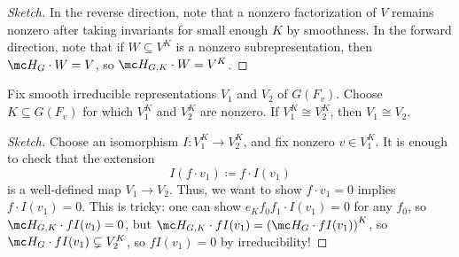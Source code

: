 \documentclass{article}
\begin{document}
\begin{proof}[Sketch]
	In the reverse direction, note that a nonzero factorization of $V$ remains nonzero after taking invariants for small enough $K$ by smoothness. In the forward direction, note that if $W\subseteq V^K$ is a nonzero subrepresentation, then $\mc H_G\cdot W=V$, so $\mc H_{G,K}\cdot W=V^K$.
\end{proof}
\begin{lemma}
	Fix smooth irreducible representations $V_1$ and $V_2$ of $G(F_v)$. Choose $K\subseteq G(F_v)$ for which $V_1^K$ and $V_2^K$ are nonzero. If $V_1^K\cong V_2^K$, then $V_1\cong V_2$.
\end{lemma}
\begin{proof}[Sketch]
	Choose an isomorphism $I\colon V_1^K\to V_2^K$, and fix nonzero $v\in V_1^K$. It is enough to check that the extension
	\[I(f\cdot v_1)\coloneqq f\cdot I(v_1)\]
	is a well-defined map $V_1\to V_2$. Thus, we want to show $f\cdot v_1=0$ implies $f\cdot I(v_1)=0$. This is tricky: one can show $e_Kf_0f_1\cdot I(v_1)=0$ for any $f_0$, so $\mc H_{G,K}\cdot fI(v_1)=0$, but $\mc H_{G,K}\cdot fI(v_1)=\left(\mc H_G\cdot fI(v_1)\right)^K$, so $\mc H_G\cdot fI(v_1)\subsetneq V_2^K$, so $fI(v_1)=0$ by irreducibility!
\end{proof}
\end{document}
